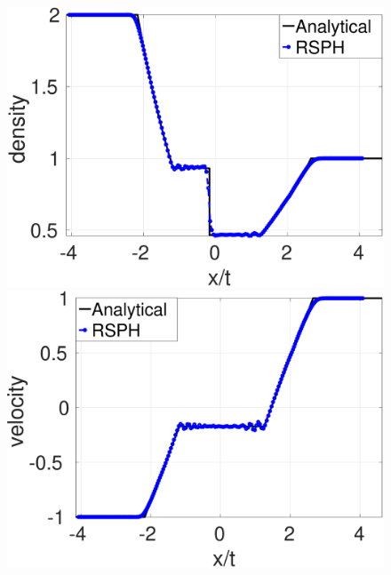 \begin{figure}[H]
    \centering
    \begin{minipage}{.495\textwidth}
        \centering
        \includegraphics[width=0.99 \textwidth]{Chapter-4/Figures/double_exp/Dexp-RCM-rho}
    \end{minipage}%
    \begin{minipage}{.495 \textwidth}
        \centering
        \includegraphics[width=0.99 \textwidth]{Chapter-4/Figures/double_exp/Dexp-RCM-v}
    \end{minipage}%
    \\
    \begin{minipage}{.495\textwidth}
        \centering

\end{minipage}
\end{figure}
